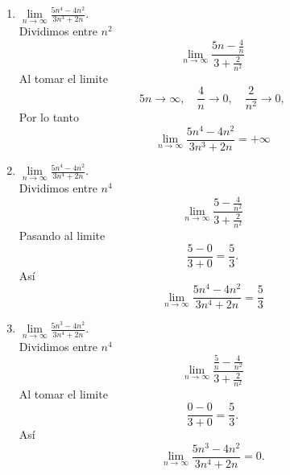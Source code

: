 \documentclass[12pt,a4paper]{article}
\begin{document}
    \begin{solucion}
        \begin{enumerate}
            \item[(a)]  $\underset{n\rightarrow\infty}{\lim}\frac{5n^{4}-4n^{2}}{3n^{3}+2n}.$\\
            Dividimos entre $n^{2}$
            \begin{equation*}
                \lim_{n\to\infty}\frac{5n-\frac{4}{n}}{3+\frac{2}{n^{2}}}
            \end{equation*}
            Al tomar el limite
            \begin{equation*}
                5n\to\infty,\quad\frac{4}{n}\to0,\quad\frac{2}{n^{2}}\to0,
            \end{equation*}
            Por lo tanto
            \begin{equation*}
                \underset{n\rightarrow\infty}{\lim}\frac{5n^{4}-4n^{2}}{3n^{3}+2n}=+\infty
            \end{equation*}
            \item[(b)]  $\underset{n\rightarrow\infty}{\lim}\frac{5n^{4}-4n^{2}}{3n^{4}+2n}.$\\
            Dividimos entre $n^{4}$
            \begin{equation*}
                \lim_{n\to\infty}\frac{5-\frac{4}{n^{2}}}{3+\frac{2}{n^{2}}}
            \end{equation*}
            Pasando al limite
            \begin{equation*}
                \frac{5-0}{3+0}=\frac{5}{3}.
            \end{equation*}
            Así
            \begin{equation*}
                \underset{n\rightarrow\infty}{\lim}\frac{5n^{4}-4n^{2}}{3n^{4}+2n}=\frac{5}{3}
            \end{equation*}
            \item[(c)]  $\underset{n\rightarrow\infty}{\lim}\frac{5n^{3}-4n^{2}}{3n^{4}+2n}.$\\
            Dividimos entre $n^{4}$
            \begin{equation*}
                \lim_{n\to\infty}\frac{\frac{5}{n}-\frac{4}{n^{2}}}{3+\frac{2}{n^{2}}}
            \end{equation*}
            Al tomar el limite
            \begin{equation*}
                \frac{0-0}{3+0}=\frac{5}{3}.
            \end{equation*}
            Así
            \begin{equation*}
                \underset{n\rightarrow\infty}{\lim}\frac{5n^{3}-4n^{2}}{3n^{4}+2n}=0.
            \end{equation*}
        \end{enumerate}
    \end{solucion}
\end{document}

